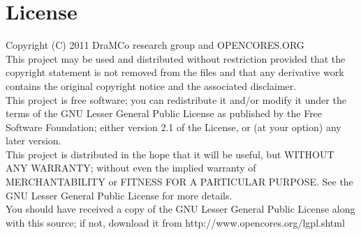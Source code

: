 \chapter*{License}
Copyright (C) 2011 DraMCo research group and OPENCORES.ORG \\This project may be used and distributed without restriction
provided that the copyright statement is not removed from the files and that any derivative work contains the original
copyright notice and the associated disclaimer.\\
 
This project is free software; you can redistribute it and/or modify it under the terms of the GNU Lesser General Public
License as published by the Free Software Foundation; either version 2.1 of the License, or (at your option) any later
version.\\
 
This project is distributed in the hope that it will be useful, but WITHOUT ANY WARRANTY; without even the implied
warranty of MERCHANTABILITY or FITNESS FOR A PARTICULAR PURPOSE. See the GNU Lesser General Public License for more
details.\\

You should have received a copy of the GNU Lesser General Public License along with this source; if not, download it
from http://www.opencores.org/lgpl.shtml